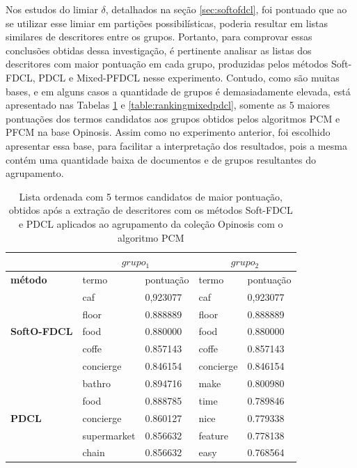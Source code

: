 Nos estudos do limiar $\delta$, detalhados na seção \ref{sec:softofdcl}, foi pontuado que ao 
se utilizar esse limiar em partições possibilísticas, poderia resultar em listas similares de
descritores entre os grupos. Portanto, para comprovar essas conclusões obtidas dessa
investigação, é pertinente analisar as listas dos descritores com maior pontuação em cada grupo,
produzidas pelos métodos Soft-FDCL, PDCL e Mixed-PFDCL nesse experimento. Contudo, como são muitas
bases, e em alguns casos a quantidade de grupos é demasiadamente elevada, está apresentado nas
Tabelas \ref{table:rankingpdcl} e \ref{table:rankingmixedpdcl}, somente as 5 maiores pontuações dos
termos candidatos aos grupos obtidos pelos algoritmos PCM e PFCM na base Opinosis. Assim como no
experimento anterior, foi escolhido apresentar essa base, para facilitar a interpretação dos
resultados, pois a mesma contém uma quantidade baixa de documentos e de grupos resultantes do
agrupamento.

\begin{table}[!htp]
  \centering
  \begin{tabular}{ |l| l l | l l|}
    \hline
    & \multicolumn{2}{c|}{$grupo_1$} & \multicolumn{2}{c|}{$grupo_2$} \\
    \hline
    {\bf método} & termo & pontuação & termo & pontuação \\
    \hline
    \multirow{5}{*}{{\bf SoftO-FDCL}} & caf & 0,923077 & caf & 0,923077 \\
                                       & floor	    & 0.888889  & floor	  & 0.888889 \\
                                       & food	    & 0.880000  & food	  & 0.880000 \\
                                       & coffe	    & 0.857143  & coffe	  & 0.857143 \\
                                       & concierge  & 0.846154  & concierge & 0.846154 \\
    \hline
    \multirow{5}{*}{{\bf PDCL}} & bathro      &  0.894716  & make    & 0.800980 \\       
                                 & food        &  0.888785  & time    & 0.789846 \\       
                                 & concierge    &  0.860127  & nice    & 0.779338 \\       
                                 & supermarket &  0.856632  & feature & 0.778138 \\       
                                 & chain       &  0.856632  & easy    & 0.768564 \\       
    \hline
  \end{tabular}
  \caption{Lista ordenada com 5 termos candidatos de maior pontuação, obtidos após a extração de
  descritores com os métodos Soft-FDCL e PDCL aplicados ao agrupamento da coleção Opinosis com o
algoritmo PCM}
  \label{table:rankingpdcl}
\end{table}

